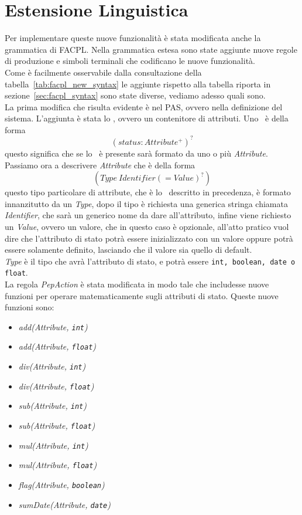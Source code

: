 \section{Estensione Linguistica} %
\label{sec:estensione_linguistica}
Per implementare queste nuove funzionalità è stata modificata anche la grammatica di FACPL.
Nella grammatica estesa sono state aggiunte nuove regole di produzione e simboli terminali che 
codificano le nuove funzionalità.\\

Come è facilmente osservabile dalla consultazione della tabella~\ref{tab:facpl_new_syntax} le aggiunte rispetto alla tabella riporta in sezione~\ref{sec:facpl_syntax} sono state diverse, vediamo adesso quali sono.\\
La prima modifica che risulta evidente è nel PAS, ovvero nella definizione del sistema. L'aggiunta è stata lo \status, ovvero un contenitore di attributi.
Uno \status \ è della forma $$(status: Attribute^+)^?$$ questo significa che se lo \status \ è presente sarà formato da uno o più \textit{Attribute}.\\
Passiamo ora a descrivere \textit{Attribute} che è della forma $$(Type\ Identifier (= Value)^?)$$
questo tipo particolare di attribute, che è lo \statusattribute \ descritto in precedenza, è formato innanzitutto da un \textit{Type}, dopo il tipo è richiesta una generica stringa chiamata \textit{Identifier}, che sarà un generico nome da dare all'attributo, infine viene richiesto un \textit{Value}, ovvero un valore, che in questo caso è opzionale, all'atto pratico vuol dire che l'attributo di stato potrà essere inizializzato con un valore oppure potrà essere solamente definito, lasciando che il valore sia quello di default.\\
\textit{Type} è il tipo che avrà l'attributo di stato, e potrà essere \texttt{int, boolean, date o float}.\\
La regola \textit{PepAction} è stata modificata in modo tale che includesse nuove funzioni per operare matematicamente sugli attributi di stato.
Queste nuove funzioni sono:
\begin{itemize}
	\item \textit{add(Attribute, \texttt{int})}
	\item \textit{add(Attribute, \texttt{float})}
	\item \textit{div(Attribute, \texttt{int})}
	\item \textit{div(Attribute, \texttt{float})}
	\item \textit{sub(Attribute, \texttt{int})}
	\item \textit{sub(Attribute, \texttt{float})}
	\item \textit{mul(Attribute, \texttt{int})}
	\item \textit{mul(Attribute, \texttt{float})}
	\item \textit{flag(Attribute, \texttt{boolean})}
	\item \textit{sumDate(Attribute, \texttt{date})} 
	 
\end{itemize}
